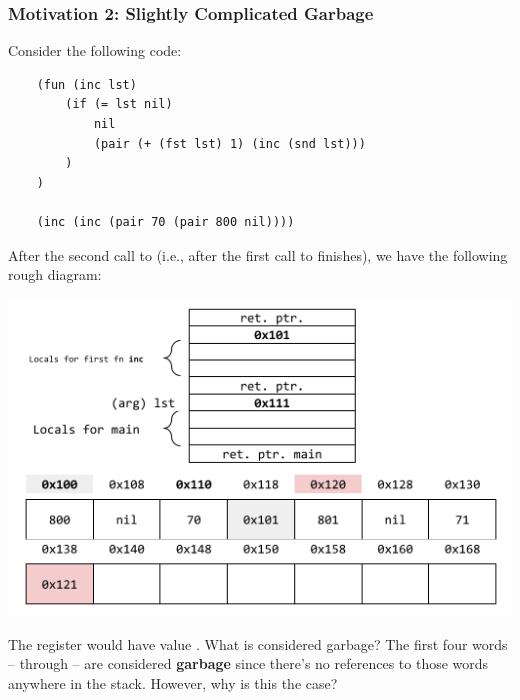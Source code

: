 \subsubsection{Motivation 2: Slightly Complicated Garbage}
Consider the following code: 
\begin{verbatim}
    (fun (inc lst)
        (if (= lst nil)
            nil 
            (pair (+ (fst lst) 1) (inc (snd lst)))
        )
    )

    (inc (inc (pair 70 (pair 800 nil))))\end{verbatim}

After the second call to  (i.e., after the first call to  finishes), we have the following rough diagram:
\begin{center}
    \includegraphics[scale=0.7]{assets/stackHeapPairGC2.png}
\end{center}
The register  would have value . What is considered garbage? The first four words --  through  -- are considered \textbf{garbage} since there's no references to those words anywhere in the stack. However, why is this the case?  
